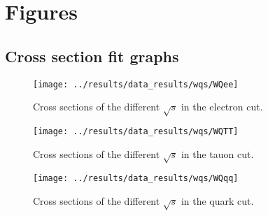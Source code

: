 \section{Figures}
\subsection{Cross section fit graphs}
\begin{figure}[H]
	\centering
	\texttt{[image: ../results/data\_results/wqs/WQee]}
	\caption[Cross sections for electron cut]{Cross sections of the different $\sqrt{s}$ in the electron cut.}
	\label{fig:WQee}
\end{figure}

\begin{figure}[H]
	\centering
	\texttt{[image: ../results/data\_results/wqs/WQTT]}
	\caption[Cross sections for tauon cut]{Cross sections of the different $\sqrt{s}$ in the tauon cut.}
	\label{fig:WQTT}
\end{figure}

\begin{figure}[H]
	\centering
	\texttt{[image: ../results/data\_results/wqs/WQqq]}
	\caption[Cross sections for quark cut]{Cross sections of the different $\sqrt{s}$ in the quark cut.}
	\label{fig:WQqq}
\end{figure}	